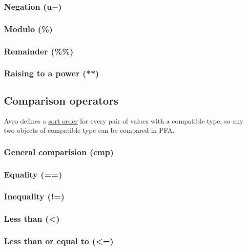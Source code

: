 \documentclass{article}
\theoremstyle{definition}
\begin{document}
\subsubsection{Negation (u$-$)}

\subsubsection{Modulo (\%)}

\subsubsection{Remainder (\%\%)}

\subsubsection{Raising to a power (**)}

\subsection{Comparison operators}

Avro defines a \href{http://avro.apache.org/docs/1.7.6/spec.html#order}{sort order} for every pair of values with a compatible type, so any two objects of compatible type can be compared in PFA.

\subsubsection{General comparision (cmp)}

\subsubsection{Equality (==)}

\subsubsection{Inequality (!=)}

\subsubsection{Less than (<)}

\subsubsection{Less than or equal to (<=)}
\end{document}
